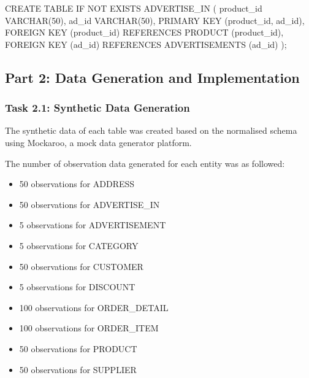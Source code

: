 \documentclass[
  letterpaper,
  DIV=11,
  numbers=noendperiod]{scrartcl}
\newenvironment{Shaded}{\begin{snugshade}}{\end{snugshade}}
\newcommand{\ControlFlowTok}[1]{\textcolor[rgb]{0.00,0.23,0.31}{#1}}
\newcommand{\DataTypeTok}[1]{\textcolor[rgb]{0.68,0.00,0.00}{#1}}
\newcommand{\DecValTok}[1]{\textcolor[rgb]{0.68,0.00,0.00}{#1}}
\newcommand{\KeywordTok}[1]{\textcolor[rgb]{0.00,0.23,0.31}{#1}}
\newcommand{\NormalTok}[1]{\textcolor[rgb]{0.00,0.23,0.31}{#1}}
\begin{document}
\begin{enumerate}
\begin{Shaded}
\begin{Highlighting}[]
\KeywordTok{CREATE} \KeywordTok{TABLE} \ControlFlowTok{IF} \KeywordTok{NOT} \KeywordTok{EXISTS}\NormalTok{ ADVERTISE\_IN (}
\NormalTok{  product\_id }\DataTypeTok{VARCHAR}\NormalTok{(}\DecValTok{50}\NormalTok{),}
\NormalTok{  ad\_id }\DataTypeTok{VARCHAR}\NormalTok{(}\DecValTok{50}\NormalTok{),}
  \KeywordTok{PRIMARY} \KeywordTok{KEY}\NormalTok{ (product\_id, ad\_id),}
  \KeywordTok{FOREIGN} \KeywordTok{KEY}\NormalTok{ (product\_id) }\KeywordTok{REFERENCES}\NormalTok{ PRODUCT (product\_id),}
  \KeywordTok{FOREIGN} \KeywordTok{KEY}\NormalTok{ (ad\_id)      }\KeywordTok{REFERENCES}\NormalTok{ ADVERTISEMENTS (ad\_id)}
\NormalTok{);}
\end{Highlighting}
\end{Shaded}
\end{enumerate}

\hypertarget{part-2-data-generation-and-implementation}{%
\subsection{Part 2: Data Generation and
Implementation}\label{part-2-data-generation-and-implementation}}

\hypertarget{task-2.1-synthetic-data-generation}{%
\subsubsection{Task 2.1: Synthetic Data
Generation}\label{task-2.1-synthetic-data-generation}}

The synthetic data of each table was created based on the normalised
schema using Mockaroo, a mock data generator platform.

The number of observation data generated for each entity was as
followed:

\begin{itemize}
\item
  50 observations for ADDRESS
\item
  50 observations for ADVERTISE\_IN
\item
  5 observations for ADVERTISEMENT
\item
  5 observations for CATEGORY
\item
  50 observations for CUSTOMER
\item
  5 observations for DISCOUNT
\item
  100 observations for ORDER\_DETAIL
\item
  100 observations for ORDER\_ITEM
\item
  50 observations for PRODUCT
\item
  50 observations for SUPPLIER
\end{itemize}
\end{document}
